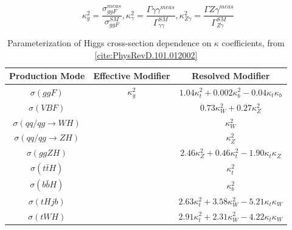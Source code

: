 \begin{equation}
\kappa_{g}^{2} = \frac{\sigma_{ggF}^{meas}}{\sigma_{ggF}^{SM}}, \kappa_{\gamma}^{2} = \frac{\Gamma{\gamma \gamma}^{meas}}{\Gamma_{\gamma \gamma}^{SM}}, \kappa_{Z \gamma}^{2} = \frac{\Gamma{Z \gamma}^{meas}}{\Gamma_{Z \gamma}^{SM}}
\end{equation}

\begin{table}[h]
    \centering
    \begin{tabular}{ccc}
	Production Mode & Effective Modifier & Resolved Modifier \\ \hline
	$\sigma(ggF)$ & $\kappa_{g}^{2}$ & $1.04 \kappa_{t}^{2} + 0.002 \kappa_{b}^2 - 0.04 \kappa_{t} \kappa_{b}$ \\
	$\sigma(VBF)$ & & $0.73 \kappa_{W}^{2} + 0.27 \kappa_{Z}^2$ \\
	$\sigma(qq/qg \rightarrow W H)$ & & $\kappa_{W}^{2}$ \\
	$\sigma(qq/qg \rightarrow ZH)$ & & $\kappa_{Z}^{2}$\\
	$\sigma(ggZH)$ && $2.46 \kappa_{Z}^{2} + 0.46 \kappa_{t}^2 - 1.90 \kappa_{t} \kappa_{Z}$ \\
	$\sigma(t\bar{t}H)$ && $\kappa_{t}^{2}$ \\
	$\sigma(b\bar{b}H)$ && $\kappa_{b}^{2}$ \\
	$\sigma(tHjb)$ && $2.63 \kappa_{t}^{2} + 3.58 \kappa_{W}^2 - 5.21 \kappa_{t} \kappa_{W}$ \\
	$\sigma(tWH)$ && $2.91 \kappa_{t}^{2} + 2.31 \kappa_{W}^2 - 4.22 \kappa_{t} \kappa_{W}$ \\
    \end{tabular}
    \caption{Parameterization of Higgs cross-section dependence on $\kappa$ coefficients, from \ref{cite:PhysRevD.101.012002}}
    \label{Xsecskappa}
\end{table}


